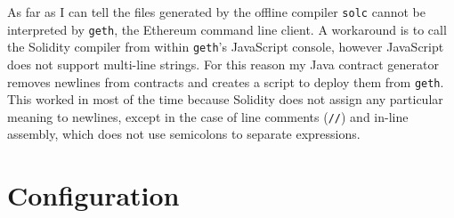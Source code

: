 \documentclass[12pt,a4paper,twoside,openright]{report}
\begin{document}
As far as I can tell the files generated by the offline compiler \texttt{solc} cannot be interpreted by \texttt{geth}, the Ethereum command line client.
A workaround is to call the Solidity compiler from within \texttt{geth}'s JavaScript console,
however JavaScript does not support multi-line strings.
For this reason my Java contract generator removes newlines from contracts and creates a script to deploy them from \texttt{geth}.
This worked in most of the time because Solidity does not assign any particular meaning to newlines, except in the case of line comments (\texttt{//}) and in-line assembly,
which does not use semicolons to separate expressions.



%
%
%
%
%


\section{Configuration}
\end{document}
